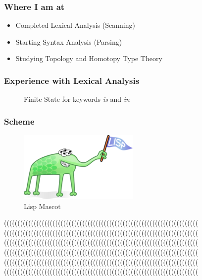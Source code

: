 \documentclass{beamer}
\begin{document}
\begin{frame}
\frametitle{Where I am at}
\begin{itemize}
    \item Completed Lexical Analysis (Scanning)
    \item Starting Syntax Analysis (Parsing)
    \item Studying Topology and Homotopy Type Theory \cite{hott}
\end{itemize}
\end{frame}

\begin{frame}
\frametitle{Experience with Lexical Analysis}
\begin{figure} 
    \caption{Finite State for keywords \textit{is} and \textit{in}}
\end{figure}
\end{frame}
\begin{frame}
\frametitle{Scheme}
\begin{figure}
    \centering
    \includegraphics[scale=0.45]{lisp.png}
    \caption{Lisp Mascot \cite{seasoned}}
    \label{fig:enter-label}
\end{figure}
((((((((((((((((((((((((((((((((((((((((((((((((((((((((((((((((((((((((
((((((((((((((((((((((((((((((((((((((((((((((((((((((((((((((((((((((((
((((((((((((((((((((((((((((((((((((((((((((((((((((((((((((((((((((((((
((((((((((((((((((((((((((((((((((((((((((((((((((((((((((((((((((((((((
((((((((((((((((((((((((((((((((((((((((((((((((((((((((((((((((((((((((
((((((((((((((((((((((((((((((((((((((((((((((((((((((((((((((((((((((((
\end{frame}
\end{document}

